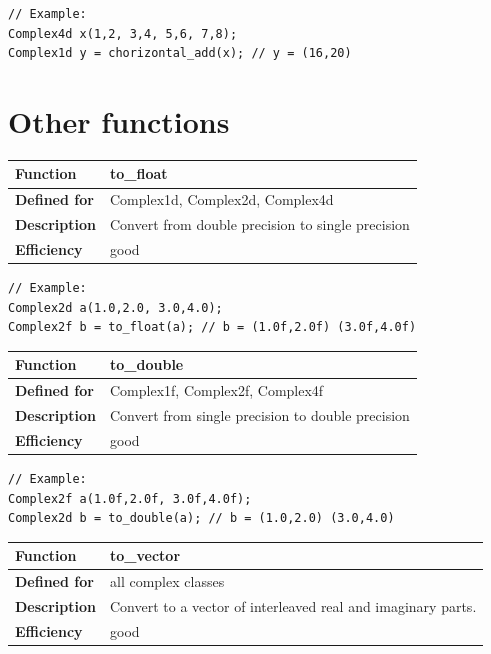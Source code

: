 \documentclass[11pt,a4paper,oneside,openright]{report}
\newcommand{\vspacesmall}{\vspace{3mm}}
\newcommand{\vspacebig}{\vspace{6mm}}
\begin{document}
\begin{lstlisting}[frame=none]
// Example:
Complex4d x(1,2, 3,4, 5,6, 7,8);
Complex1d y = chorizontal_add(x); // y = (16,20)
\end{lstlisting}
\vspacebig


\chapter{Other functions}\label{chap:OtherFunctions}

\begin{tabular}{|p{25mm}|p{100mm}|}
\hline
\bfseries Function & to\_float \\ \hline
\bfseries Defined for & Complex1d, Complex2d, Complex4d  \\ \hline
\bfseries Description & Convert from double precision to single precision \\ \hline
\bfseries Efficiency & good \\ \hline
\end{tabular}
\vspacesmall

\begin{lstlisting}[frame=none]
// Example:
Complex2d a(1.0,2.0, 3.0,4.0);
Complex2f b = to_float(a); // b = (1.0f,2.0f) (3.0f,4.0f)
\end{lstlisting}
\vspacebig


\begin{tabular}{|p{25mm}|p{100mm}|}
\hline
\bfseries Function & to\_double \\ \hline
\bfseries Defined for & Complex1f, Complex2f, Complex4f  \\ \hline
\bfseries Description & Convert from single precision to double precision \\ \hline
\bfseries Efficiency & good \\ \hline
\end{tabular}
\vspacesmall

\begin{lstlisting}[frame=none]
// Example:
Complex2f a(1.0f,2.0f, 3.0f,4.0f);
Complex2d b = to_double(a); // b = (1.0,2.0) (3.0,4.0)
\end{lstlisting}
\vspacebig


\begin{tabular}{|p{25mm}|p{100mm}|}
\hline
\bfseries Function & to\_vector \\ \hline
\bfseries Defined for & all complex classes  \\ \hline
\bfseries Description & Convert to a vector of interleaved real and imaginary parts. \\ \hline
\bfseries Efficiency & good \\ \hline
\end{tabular}
\vspacesmall
\end{document}
